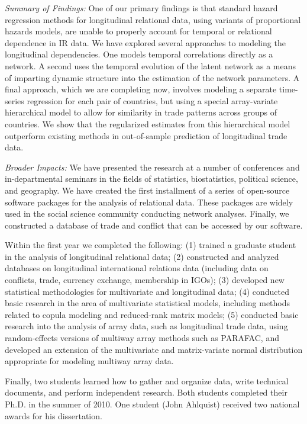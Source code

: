 \documentclass[pdftex,12pt,fullpage,oneside]{amsart}
\begin{document}
\textit{Summary of Findings:} One of our primary findings is that
standard hazard regression methods for longitudinal relational data,
using variants of proportional hazards models, are unable to properly
account for temporal or relational dependence in IR data. We have
explored several approaches to modeling the longitudinal dependencies.
One models temporal correlations directly as a network.  A second uses
the temporal evolution of the latent network as a means of imparting
dynamic structure into the estimation of the network parameters.  A
final approach, which we are completing now, involves modeling a
separate time-series regression for each pair of countries, but using
a special array-variate hierarchical model to allow for similarity in
trade patterns across groups of countries. We show that the
regularized estimates from this hierarchical model outperform existing
methods in out-of-sample prediction of longitudinal trade data.

\textit{Broader Impacts:} We have presented the research at a number
of conferences and in-departmental seminars in the fields of
statistics, biostatistics, political science, and geography. We have
created the first installment of a series of open-source software
packages for the analysis of relational data. These packages are
widely used in the social science community conducting network
analyses. Finally, we constructed a database of trade and conflict
that can be accessed by our software.

Within the first year we completed the following: (1) trained a
graduate student in the analysis of longitudinal relational data; (2)
constructed and analyzed databases on longitudinal international
relations data (including data on conflicts, trade, currency exchange,
membership in IGOs); (3) developed new statistical methodologies for
multivariate and longitudinal data; (4) conducted basic research in
the area of multivariate statistical models, including methods related
to copula modeling and reduced-rank matrix models; (5) conducted basic
research into the analysis of array data, such as longitudinal trade
data, using random-effects versions of multiway array methods such as
PARAFAC, and developed an extension of the multivariate and
matrix-variate normal distribution appropriate for modeling multiway
array data.

Finally, two students learned how to gather and organize data, write
technical documents, and perform independent research. Both students
completed their Ph.D. in the summer of 2010. One student (John
Ahlquist) received two national awards for his dissertation.
\end{document}
